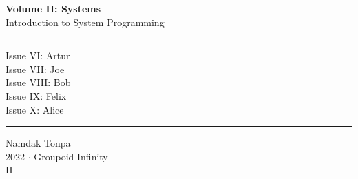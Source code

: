 \documentclass{article}
\begin{document}
\begin{titlepage}
    \centering
    \vspace*{0.5in}
    \Huge
    \textbf{Volume II: Systems} \\
    \LARGE
    Introduction to System Programming \\
    \vspace{1.5in}
    \rule{\textwidth}{0.4pt}
    \flushleft
    \small
    Issue VI: Artur \\
    Issue VII: Joe \\
    Issue VIII: Bob \\
    Issue IX: Felix \\
    Issue X: Alice \\
    \rule{\textwidth}{0.4pt}
    \centering
    \vfill
    \large
    Namdak Tonpa \\
    \Large
    2022 $\cdot$ Groupoid Infinity \\
    II
\end{titlepage}

\tableofcontents
\newif\ifincludeTOC
\includeTOCfalse
\newpage \begin{standalone}   \end{standalone} %
\newpage \begin{standalone}   \end{standalone}    %
\newpage \begin{standalone}   \end{standalone}    %
\newpage \begin{standalone}   \end{standalone}  %
\newpage \begin{standalone}   \end{standalone}  %
\end{document}
